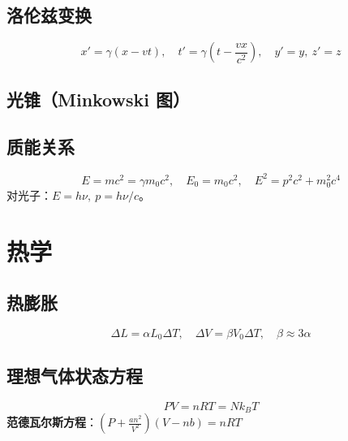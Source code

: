 \documentclass{article}
\begin{document}
\subsection{洛伦兹变换}
\begin{equation}
x' = \gamma(x - vt), \quad t' = \gamma(t - \frac{vx}{c^2}), \quad y'=y, \ z'=z
\end{equation}

\subsection{光锥（Minkowski 图）}
\begin{center}
\end{center}

\subsection{质能关系}
\begin{equation}
E = mc^2 = \gamma m_0 c^2, \quad E_0 = m_0 c^2, \quad E^2 = p^2 c^2 + m_0^2 c^4
\end{equation}
对光子：\( E = h\nu, \ p = h\nu/c \)。

\section{热学}

\subsection{热膨胀}
\begin{equation}
\Delta L = \alpha L_0 \Delta T, \quad \Delta V = \beta V_0 \Delta T, \quad \beta \approx 3\alpha
\end{equation}

\subsection{理想气体状态方程}
\begin{equation}
PV = nRT = N k_B T
\end{equation}
\textbf{范德瓦尔斯方程}：\( (P + \frac{an^2}{V^2})(V - nb) = nRT \)
\end{document}
